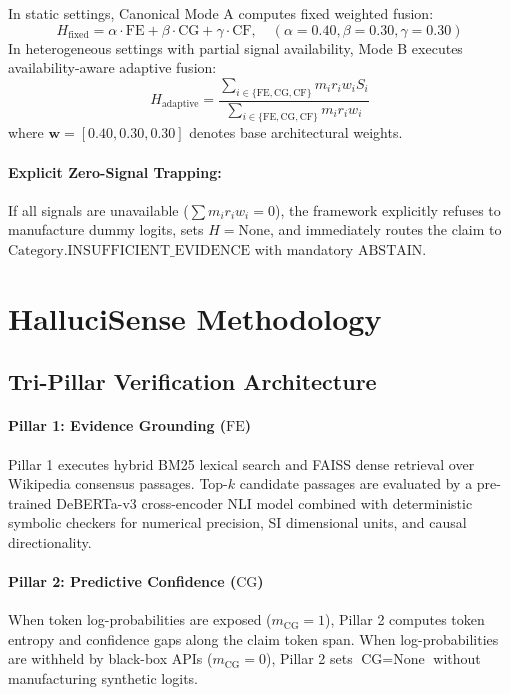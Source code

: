 \documentclass[11pt,a4paper]{article}
\begin{document}
In static settings, Canonical Mode A computes fixed weighted fusion:
\begin{equation}
H_{\text{fixed}} = \alpha \cdot \text{FE} + \beta \cdot \text{CG} + \gamma \cdot \text{CF}, \quad (\alpha=0.40, \beta=0.30, \gamma=0.30)
\end{equation}
In heterogeneous settings with partial signal availability, Mode B executes availability-aware adaptive fusion:
\begin{equation}
H_{\text{adaptive}} = \frac{\sum_{i \in \{\text{FE}, \text{CG}, \text{CF}\}} m_i r_i w_i S_i}{\sum_{i \in \{\text{FE}, \text{CG}, \text{CF}\}} m_i r_i w_i}
\label{eq:adaptive_fusion}
\end{equation}
where $\mathbf{w} = [0.40, 0.30, 0.30]$ denotes base architectural weights.

\paragraph{Explicit Zero-Signal Trapping:} If all signals are unavailable ($\sum m_i r_i w_i = 0$), the framework explicitly refuses to manufacture dummy logits, sets $H = \text{None}$, and immediately routes the claim to $\text{Category.INSUFFICIENT\_EVIDENCE}$ with mandatory $\text{ABSTAIN}$.

\section{HalluciSense Methodology}
\label{sec:methodology}

\subsection{Tri-Pillar Verification Architecture}


\paragraph{Pillar 1: Evidence Grounding ($\text{FE}$)}
Pillar 1 executes hybrid BM25 lexical search and FAISS dense retrieval over Wikipedia consensus passages. Top-$k$ candidate passages are evaluated by a pre-trained DeBERTa-v3 cross-encoder NLI model \citep{he2021deberta} combined with deterministic symbolic checkers for numerical precision, SI dimensional units, and causal directionality.

\paragraph{Pillar 2: Predictive Confidence ($\text{CG}$)}
When token log-probabilities are exposed ($m_{\text{CG}} = 1$), Pillar 2 computes token entropy and confidence gaps along the claim token span. When log-probabilities are withheld by black-box APIs ($m_{\text{CG}} = 0$), Pillar 2 sets $\text{CG} = \text{None}$ without manufacturing synthetic logits.
\end{document}
